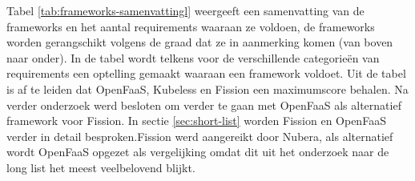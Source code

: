 Tabel \ref{tab:frameworks-samenvattingl} weergeeft een samenvatting van de frameworks en het aantal requirements waaraan ze voldoen, de frameworks worden gerangschikt volgens de graad dat ze in aanmerking komen (van boven naar onder). In de tabel wordt telkens voor de verschillende categorieën van requirements een optelling gemaakt waaraan een framework voldoet. Uit de tabel is af te leiden dat OpenFaaS, Kubeless en Fission een maximumscore behalen. Na verder onderzoek werd besloten om verder te gaan met OpenFaaS als alternatief framework voor Fission. In sectie \ref{sec:short-list} worden Fission en OpenFaaS verder in detail besproken.Fission werd aangereikt door Nubera, als alternatief wordt OpenFaaS opgezet als vergelijking omdat dit uit het onderzoek naar de long list het meest veelbelovend blijkt. 
\\
\begin{table}[]
    \centering
\end{table}
